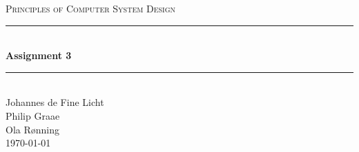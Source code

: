 \documentclass[12pt]{article}
\newcommand{\HRule}{\rule{\linewidth}{0.5mm}}
\begin{document}
\begin{center}
\textsc{\LARGE Principles of Computer System Design}\\[0.3cm] %
\HRule \\[0.4cm]
{ \huge \bfseries Assignment 3} %
\HRule \\[0.4cm]
\large
Johannes de Fine Licht %
\\Philip Graae
\\Ola Rønning
\\\today
\end{center}
\end{document}
